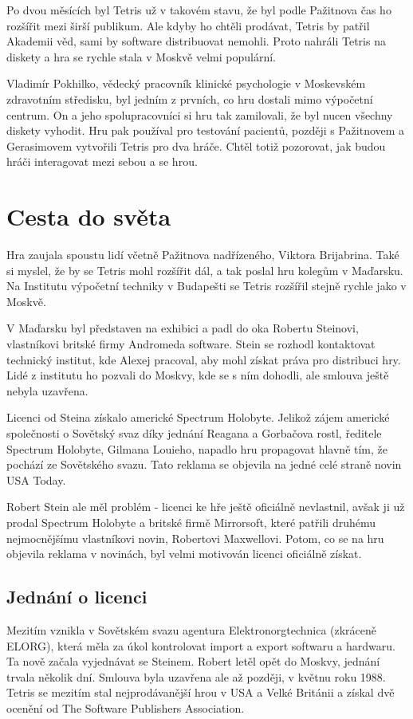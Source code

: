 \documentclass[12pt]{report}			%
\begin{document}
Po dvou měsících byl Tetris už v takovém stavu, že byl podle Pažitnova čas ho rozšířit mezi širší publikum. Ale kdyby ho chtěli prodávat, Tetris by patřil Akademii věd, sami by software distribuovat nemohli. Proto nahráli Tetris na diskety a hra se rychle stala v Moskvě velmi populární.\cite{Ackerman2016}

Vladimír Pokhilko, vědecký pracovník klinické psychologie v Moskevském zdravotním středisku, byl jedním z prvních, co hru dostali mimo výpočetní centrum. On a jeho spolupracovníci si hru tak zamilovali, že byl nucen všechny diskety vyhodit. Hru pak používal pro testování pacientů, později s Pažitnovem a Gerasimovem vytvořili Tetris pro dva hráče. Chtěl totiž pozorovat, jak budou hráči interagovat mezi sebou a se hrou.\cite{Ackerman2016}\\
		\chapter{Cesta do světa}
Hra zaujala spoustu lidí včetně Pažitnova nadřízeného, Viktora Brijabrina. Také si myslel, že by se Tetris mohl rozšířit dál, a tak poslal hru kolegům v Maďarsku. Na Institutu výpočetní techniky v Budapešti se Tetris rozšířil stejně rychle jako v Moskvě.  \cite{Ackerman2016}

V Maďarsku byl představen na exhibici a padl do oka Robertu Steinovi, vlastníkovi britské firmy Andromeda software. Stein se rozhodl kontaktovat technický institut, kde Alexej pracoval, aby mohl získat práva pro distribuci hry. Lidé z institutu ho pozvali do Moskvy, kde se s ním dohodli, ale smlouva ještě nebyla uzavřena. \cite{Brown2016}

Licenci od Steina získalo americké Spectrum Holobyte. Jelikož zájem americké společnosti o Sovětský svaz díky jednání Reagana a Gorbačova rostl, ředitele Spectrum Holobyte, Gilmana Louieho, napadlo hru propagovat hlavně tím, že pochází ze Sovětského svazu. Tato reklama se objevila na jedné celé straně novin USA Today. \cite{Brown2016}

Robert Stein ale měl problém - licenci ke hře ještě oficiálně nevlastnil, avšak ji už prodal Spectrum Holobyte a britské firmě Mirrorsoft, které patřili druhému nejmocnějšímu vlastníkovi novin, Robertovi Maxwellovi. Potom, co se na hru objevila reklama v novinách, byl velmi motivován licenci oficiálně získat. \cite{Brown2016}\\
			
			\section{Jednání o licenci}
Mezitím vznikla v Sovětském svazu agentura Elektronorgtechnica (zkráceně ELORG), která měla za úkol kontrolovat import a export softwaru a hardwaru. Ta nově začala vyjednávat se Steinem. Robert letěl opět do Moskvy, jednání trvala několik dní. Smlouva byla uzavřena ale až později, v květnu roku 1988. Tetris se mezitím stal nejprodávanější hrou v USA a Velké Británii a získal dvě ocenění od The Software Publishers Association. \cite{Brown2016}
\end{document}
